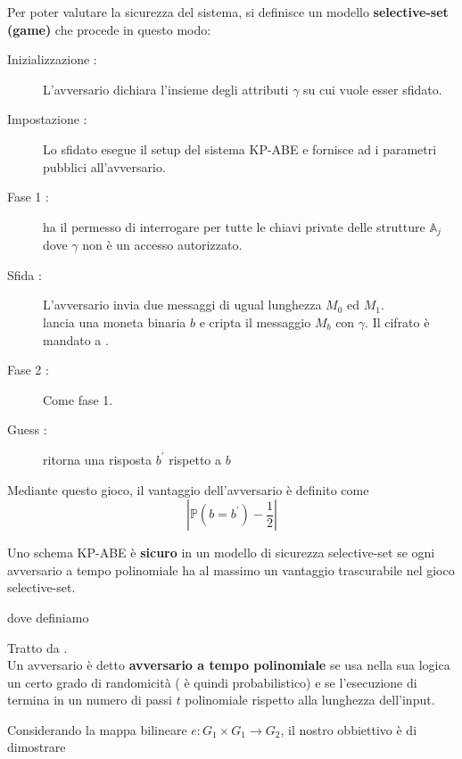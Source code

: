 \vspace{0.8cm}

Per poter valutare la sicurezza del sistema, si definisce un modello \textbf{selective-set (game)} che procede in questo modo:
\begin{description}
\item[Inizializzazione :] L'avversario  dichiara l'insieme degli attributi $\gamma$ su cui vuole esser sfidato.
\item[Impostazione :] Lo sfidato  esegue il setup del sistema KP-ABE e fornisce ad  i parametri pubblici all'avversario.
\item[Fase 1 :]  ha il permesso di interrogare  per tutte le chiavi private delle strutture $\mathbb{A}_j$ dove $\gamma$ non è un accesso autorizzato.
\item[Sfida :] L'avversario  invia due messaggi di ugual lunghezza $M_0$ ed $M_1$.\\
 lancia una moneta binaria $b$ e cripta il messaggio $M_b$ con $\gamma$. Il cifrato è mandato a .
\item[Fase 2 :] Come fase 1.
\item[Guess :]  ritorna una risposta $b^\prime$ rispetto a $b$
\end{description}

Mediante questo gioco, il vantaggio dell'avversario  è definito come \[\left\lvert \mathbb{P}(b = b^\prime) - \frac{1}{2}\right\rvert\]

\begin{defi}
Uno schema KP-ABE è \textbf{sicuro} in un modello di sicurezza selective-set se ogni avversario a tempo polinomiale ha al massimo un vantaggio trascurabile nel gioco selective-set.
\end{defi}

dove definiamo
\begin{defi}
Tratto da \cite[Def~1.2]{crittoalice}.\\
Un avversario  è detto \textbf{avversario a tempo polinomiale} se usa nella sua logica un certo grado di randomicità ( è quindi probabilistico) e se l'esecuzione di  termina in un numero di passi $t$ polinomiale rispetto alla lunghezza dell'input. 
\end{defi}

\vspace{0.5cm}
Considerando la mappa bilineare $e:G_1 \times G_1 \rightarrow G_2$, il nostro obbiettivo è di dimostrare

